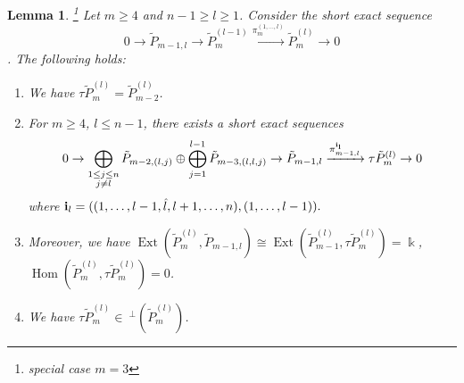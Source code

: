\documentclass{amsart}
\newtheorem{lemma}[theorem]{Lemma}
\newcommand{\kk}{\Bbbk}
\newcommand{\Ext}{\operatorname{Ext}}
\newcommand{\Hom}{\operatorname{Hom}}
\newcommand{\sesm}[4]{0\rightarrow #1\rightarrow #2\xrightarrow{#4}#3\rightarrow 0}
\begin{document}
\begin{lemma}\label{AR}\footnote{special case $m=3$}
Let $m\geq 4$ and $n-1\geq l\geq 1$. Consider the short exact sequence $$\sesm{\tilde P_{m-1,l}}{\tilde P_{m}^{(l-1)}}{\tilde P_{m}^{(l)}}{\pi^{(1,\ldots,l)}_m}$$. The following holds:
\begin{enumerate}
\item We have $\tau\tilde P_{m}^{(l)}=\tilde P_{m-2}^{(l)}$.
\item For $m\geq 4$, $l\leq n-1$, there exists a short exact sequences 
\[\sesm{\bigoplus_{\substack{1\leq j\leq n\\j\neq l}}\tilde P_{m-2,(l,j)}\oplus \bigoplus_{j=1}^{l-1}\tilde P_{m-3,(l,l,j)}}{\tilde P_{m-1,l}}{\tau\tilde P_{m}^{(l)}}{\pi^{\bf i_l}_{m-1,l}}\]
where ${\bf i}_l=((1,\ldots,l-1,\hat l,l+1,\ldots,n),(1,\ldots,l-1)).$
 
\item Moreover, we have $\Ext(\tilde P_{m}^{(l)},\tilde P_{m-1,l})\cong \Ext(\tilde P_{m-1}^{(l)},\tau\tilde P_{m}^{(l)})=\kk$, $\Hom(\tilde P_{m}^{(l)},\tau\tilde P_{m}^{(l)})=0$. 
\item We have $\tau\tilde P_{m}^{(l)}\in ~^\perp(\tilde P_{m}^{(l)})$.
\end{enumerate}%
\end{lemma}
\end{document}
